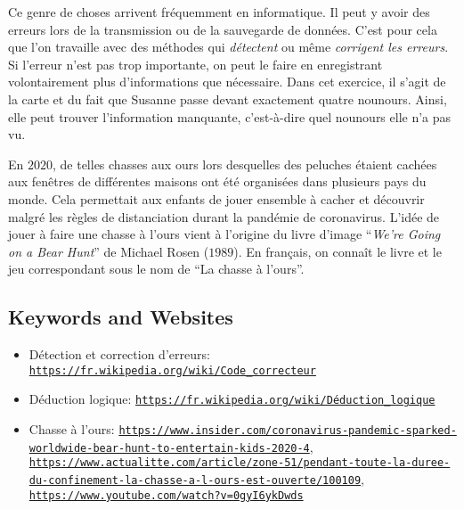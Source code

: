 \documentclass[a4paper,11pt]{report}
\newcommand{\BrochureUrlText}[1]{\texttt{#1}}
\begin{document}
Ce genre de choses arrivent fréquemment en informatique. Il peut y avoir des erreurs lors de la transmission ou de la sauvegarde de données. C’est pour cela que l’on travaille avec des méthodes qui \emph{détectent} ou même \emph{corrigent les erreurs}. Si l’erreur n’est pas trop importante, on peut le faire en enregistrant volontairement plus d’informations que nécessaire. Dans cet exercice, il s’agit de la carte et du fait que Susanne passe devant exactement quatre nounours. Ainsi, elle peut trouver l’information manquante, c’est-à-dire quel nounours elle n’a pas vu.

En $2020$, de telles chasses aux ours lors desquelles des peluches étaient cachées aux fenêtres de différentes maisons ont été organisées dans plusieurs pays du monde. Cela permettait aux enfants de jouer ensemble à cacher et découvrir malgré les règles de distanciation durant la pandémie de coronavirus. L’idée de jouer à faire une chasse à l’ours vient à l’origine du livre d’image “\emph{We’re Going on a Bear Hunt}” de Michael Rosen ($1989$). En français, on connaît le livre et le jeu correspondant sous le nom de “La chasse à l’ours”.

{\raggedright

\subsection*{Keywords and Websites}

\begin{itemize}
  \item Détection et correction d’erreurs: \href{https://fr.wikipedia.org/wiki/Code_correcteur}{\BrochureUrlText{https://fr.wikipedia.org/wiki/Code\_correcteur}}
  \item Déduction logique: \href{https://fr.wikipedia.org/wiki/D\%C3\%A9duction_logique}{\BrochureUrlText{https://fr.wikipedia.org/wiki/Déduction\_logique}}
  \item Chasse à l’ours: \href{https://www.insider.com/coronavirus-pandemic-sparked-worldwide-bear-hunt-to-entertain-kids-2020-4}{\BrochureUrlText{https://www.insider.com/coronavirus-pandemic-sparked-worldwide-bear-hunt-to-entertain-kids-2020-4}}, \href{https://www.actualitte.com/article/zone-51/pendant-toute-la-duree-du-confinement-la-chasse-a-l-ours-est-ouverte/100109}{\BrochureUrlText{https://www.actualitte.com/article/zone-51/pendant-toute-la-duree-du-confinement-la-chasse-a-l-ours-est-ouverte/100109}}, \href{https://www.youtube.com/watch?v=0gyI6ykDwds}{\BrochureUrlText{https://www.youtube.com/watch?v=0gyI6ykDwds}}
\end{itemize}


}
\end{document}
